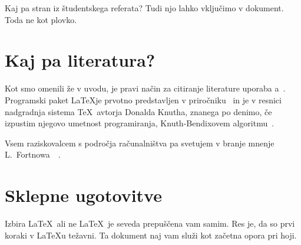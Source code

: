 Kaj pa stran iz študentskega referata?\label{pp}
Tudi njo lahko vključimo v dokument. Toda ne kot plovko.



\chapter{Kaj pa literatura?}
\label{ch3}
Kot smo omenili že v uvodu, je pravi način za citiranje literature uporaba \BibTeX{}a~\cite{bib}.
Programski paket \LaTeX je prvotno predstavljen v priročniku~\cite{lat} in je v resnici nadgradnja sistema \TeX\ avtorja Donalda Knutha, znanega po denimo, če izpustim njegovo umetnost programiranja, Knuth-Bendixovem algoritmu~\cite{dk1}.

Vsem raziskovalcem s področja računalništva pa svetujem v branje mnenje L.\ Fortnowa~\cite{lf}~\cite{trifonova}.

\chapter{Sklepne ugotovitve}
Izbira \LaTeX\ ali ne \LaTeX\ je seveda prepuščena vam samim. Res je, da so prvi koraki v \LaTeX{}u težavni. Ta dokument naj vam služi kot začetna opora pri hoji.
